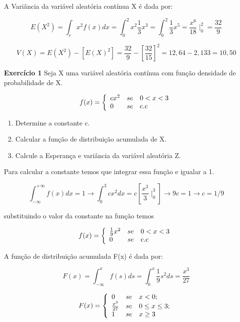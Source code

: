 A Variância da variável aleatória contínua X é dada por:

$$
E(X^{2})= \int_{r} x^{2}f(x)dx = \int^{2}_{0}x^{2}\frac{1}{3}x^{3}
= \int^{2}_{0}\frac{1}{3}x^{5} = \frac{x^{6}}{18}\mid^{2}_{0}=
\frac{32}{9}
$$

$$
V(X) = E(X^{2})-[E(X)^{2}] =
\frac{32}{9}-\left[\frac{32}{15}\right]^{2} = 12,64 - 2,133 =
10,50
$$

\textbf{Exercício 1} Seja X uma variável aleatória contínua com
função densidade de probabilidade de X.


$$
f(x)=
\left\{%
\begin{array}{ll}
   cx^{2}      & se \quad \hbox{$0 < x < 3$} \\
   0           & se \quad \hbox{c.c} \\
\end{array}%
\right.
$$

\begin{enumerate}
    \item Determine a constante c.
    \item Calcular a função de distribuição acumulada de X.
    \item Calcule a Esperança e variância da variável aleatória Z.
\end{enumerate}

Para calcular a constante temos que integrar essa função e igualar
a 1.

$$
\int_{-\infty}^{+\infty}f(x)dx = 1 \rightarrow
\int_{0}^{3}cx^{2}dx = c\left[\frac{x^{3}}{3}\mid^{3}_{0}\right]
\rightarrow 9c = 1 \rightarrow c = 1/9
$$

substituindo o valor da constante na função temos

$$
f(x)=
\left\{%
\begin{array}{ll}
   \frac{1}{9}x^{2}      & se \quad \hbox{$0 < x < 3$} \\
   0           & se \quad \hbox{c.c} \\
\end{array}%
\right.
$$

A função de distribuição acumulada F(x) é dada por:

$$
F(x) = \int^{x}_{-\infty}f(s)ds = \int^{x}_{0}\frac{1}{9}s^{2}ds =
\frac{x^{3}}{27}
$$

$$
F(x)=
\left\{%
\begin{array}{ll}
    0                 & se \quad \hbox{$x < 0$;} \\
   \frac{x^{3}}{27}   & se \quad \hbox{$0 \leq x \leq 3$;} \\
   1                  & se \quad \hbox{$x \geq 3$} \\
\end{array}%
\right.
$$

